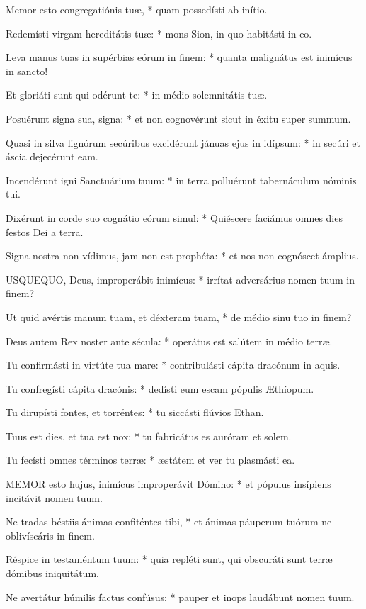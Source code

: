 Memor esto congregatiónis tuæ, * quam possedísti ab inítio.

Redemísti virgam hereditátis tuæ: * mons Sion, in quo habitásti in eo.

Leva manus tuas in supérbias eórum in finem: * quanta malignátus est inimícus in sancto!

Et gloriáti sunt qui odérunt te: * in médio solemnitátis tuæ.

Posuérunt signa sua, signa: * et non cognovérunt sicut in éxitu super summum.

Quasi in silva lignórum secúribus excidérunt jánuas ejus in idípsum: * in secúri et áscia dejecérunt eam.

Incendérunt igni Sanctuárium tuum: * in terra polluérunt tabernáculum nóminis tui.

Dixérunt in corde suo cognátio eórum simul: * Quiéscere faciámus omnes dies festos Dei a terra.

Signa nostra non vídimus, jam non est prophéta: * et nos non cognóscet ámplius.


\lettrine[lines=2]{U}{SQUEQUO}, Deus, improperábit inimícus: * irrítat adversárius nomen tuum in finem?

Ut quid avértis manum tuam, et déxteram tuam, * de médio sinu tuo in finem?

Deus autem Rex noster ante sécula: * operátus est salútem in médio terræ.

Tu confirmásti in virtúte tua mare: * contribulásti cápita dracónum in aquis.

Tu confregísti cápita dracónis: * dedísti eum escam pópulis Æthíopum.

Tu dirupísti fontes, et torréntes: * tu siccásti flúvios Ethan.

Tuus est dies, et tua est nox: * tu fabricátus es auróram et solem.

Tu fecísti omnes términos terræ: * æstátem et ver tu plasmásti ea.


\lettrine[lines=2]{M}{EMOR} esto hujus, inimícus improperávit Dómino: * et pópulus insípiens incitávit nomen tuum.

Ne tradas béstiis ánimas confiténtes tibi, * et ánimas páuperum tuórum ne oblivíscáris in finem.

Réspice in testaméntum tuum: * quia repléti sunt, qui obscuráti sunt terræ dómibus iniquitátum.

Ne avertátur húmilis factus confúsus: * pauper et inops laudábunt nomen tuum.

